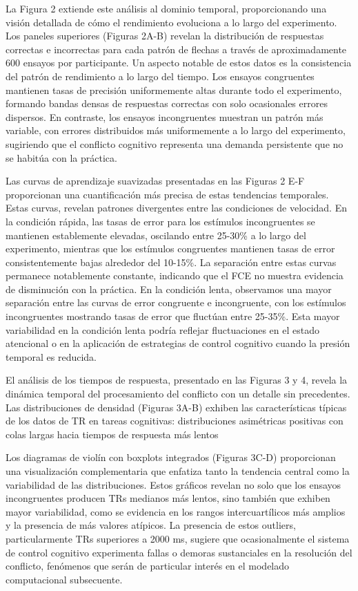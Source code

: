 \documentclass[
  spanish,
  10pt,
]{article}
\begin{document}
La Figura 2 extiende este análisis al dominio temporal, proporcionando
una visión detallada de cómo el rendimiento evoluciona a lo largo del
experimento. Los paneles superiores (Figuras 2A-B) revelan la
distribución de respuestas correctas e incorrectas para cada patrón de
flechas a través de aproximadamente 600 ensayos por participante. Un
aspecto notable de estos datos es la consistencia del patrón de
rendimiento a lo largo del tiempo. Los ensayos congruentes mantienen
tasas de precisión uniformemente altas durante todo el experimento,
formando bandas densas de respuestas correctas con solo ocasionales
errores dispersos. En contraste, los ensayos incongruentes muestran un
patrón más variable, con errores distribuidos más uniformemente a lo
largo del experimento, sugiriendo que el conflicto cognitivo representa
una demanda persistente que no se habitúa con la práctica.

Las curvas de aprendizaje suavizadas presentadas en las Figuras 2 E-F
proporcionan una cuantificación más precisa de estas tendencias
temporales. Estas curvas, revelan patrones divergentes entre las
condiciones de velocidad. En la condición rápida, las tasas de error
para los estímulos incongruentes se mantienen establemente elevadas,
oscilando entre 25-30\% a lo largo del experimento, mientras que los
estímulos congruentes mantienen tasas de error consistentemente bajas
alrededor del 10-15\%. La separación entre estas curvas permanece
notablemente constante, indicando que el FCE no muestra evidencia de
disminución con la práctica. En la condición lenta, observamos una mayor
separación entre las curvas de error congruente e incongruente, con los
estímulos incongruentes mostrando tasas de error que fluctúan entre
25-35\%. Esta mayor variabilidad en la condición lenta podría reflejar
fluctuaciones en el estado atencional o en la aplicación de estrategias
de control cognitivo cuando la presión temporal es reducida.

El análisis de los tiempos de respuesta, presentado en las Figuras 3 y
4, revela la dinámica temporal del procesamiento del conflicto con un
detalle sin precedentes. Las distribuciones de densidad (Figuras 3A-B)
exhiben las características típicas de los datos de TR en tareas
cognitivas: distribuciones asimétricas positivas con colas largas hacia
tiempos de respuesta más lentos

Los diagramas de violín con boxplots integrados (Figuras 3C-D)
proporcionan una visualización complementaria que enfatiza tanto la
tendencia central como la variabilidad de las distribuciones. Estos
gráficos revelan no solo que los ensayos incongruentes producen TRs
medianos más lentos, sino también que exhiben mayor variabilidad, como
se evidencia en los rangos intercuartílicos más amplios y la presencia
de más valores atípicos. La presencia de estos outliers, particularmente
TRs superiores a 2000 ms, sugiere que ocasionalmente el sistema de
control cognitivo experimenta fallas o demoras sustanciales en la
resolución del conflicto, fenómenos que serán de particular interés en
el modelado computacional subsecuente.
\end{document}
